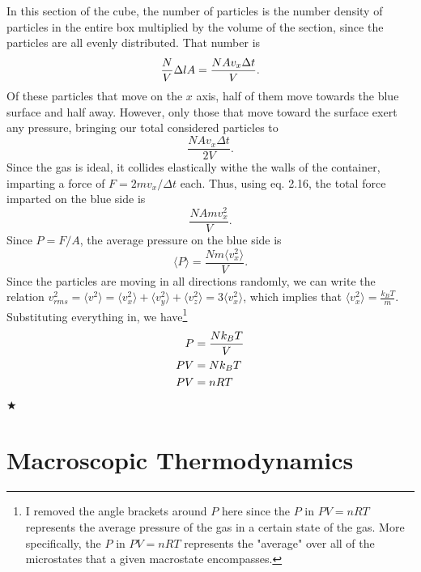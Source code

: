 \noindent In this section of the cube, the number of particles is the number density of particles in the entire box multiplied by the volume of the section, since the particles are all evenly distributed. That number is 
\begin{equation}
    \frac{N}{V}\Delta lA =\frac{NAv_x\Delta t}{V}. \nonumber
\end{equation}
\noindent Of these particles that move on the $x$ axis, half of them move towards the blue surface and half away. However, only those that move toward the surface exert any pressure, bringing our total considered particles to 
\begin{equation}
    \frac{NAv_x\Delta t}{2V}. 
\end{equation}
\noindent Since the gas is ideal, it collides elastically withe the walls of the container, imparting a force of $F = 2mv_x/\Delta t$ each. Thus, using eq. 2.16, the total force imparted on the blue side is 
\begin{equation}
    \frac{NAmv_x^2}{V}.
\end{equation}
\noindent Since $P = F/A$, the average pressure on the blue side is 
\begin{equation}
    \langle P\rangle = \frac{Nm\langle v_x^2\rangle}{V}.
\end{equation}
\noindent Since the particles are moving in all directions randomly, we can write the relation $v_{rms}^2 = \langle v^2\rangle = \langle v_x^2\rangle + \langle v_y^2\rangle + \langle v_z^2\rangle = 3\langle v_x^2\rangle$, which implies that $\langle v_x^2\rangle = \frac{k_BT}{m}$. Substituting everything in, we have\footnote{I removed the angle brackets around $P$ here since the $P$ in $PV = nRT$ represents the average pressure of the gas in a certain state of the gas. More specifically, the $P$ in $PV = nRT$ represents the "average" over all of the microstates that a given macrostate encompasses.}
\begin{align}
    P &= \frac{Nk_BT}{V} \nonumber \\
    PV &= Nk_BT \\
    PV &= nRT
\end{align}
$\bigstar$

\clearpage

%
%
%
%

\section{Macroscopic Thermodynamics}\label{2.2}

